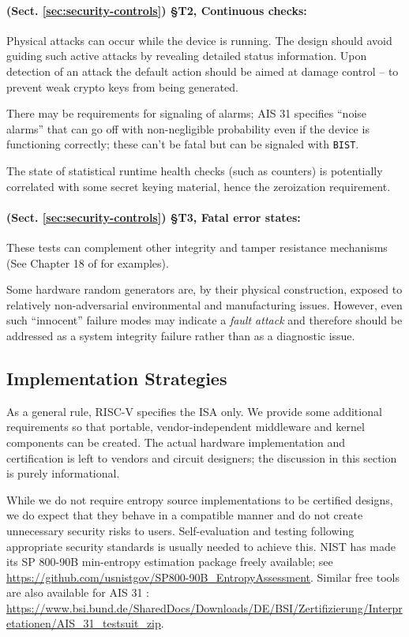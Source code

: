     \paragraph{(Sect. \ref{sec:security-controls}) \S T2, Continuous checks:}
    Physical attacks can occur while the device is running. The design
    should avoid guiding such active attacks by revealing detailed
    status information. Upon detection of an attack the default action
    should be aimed at damage control -- to prevent weak crypto keys from
    being generated.

    There may be requirements for signaling of alarms; AIS 31 specifies
    ``noise alarms'' that can go off with non-negligible probability
    even if the device is functioning correctly; these can't be fatal
    but can be signaled with \verb|BIST|.

    The state of statistical runtime health checks (such as counters)
    is potentially correlated with some secret keying material, hence
    the zeroization requirement.

    \paragraph{(Sect. \ref{sec:security-controls}) \S T3, Fatal error states:}
    These tests can complement other integrity and tamper resistance
    mechanisms (See Chapter 18 of \cite{An20} for examples).

    Some hardware random generators are, by their physical construction,
    exposed to relatively non-adversarial environmental and manufacturing
    issues. However, even such  ``innocent'' failure modes may indicate
    a  \emph{fault attack} \cite{KaScVe13} and therefore should be addressed
    as a system integrity failure rather than as a diagnostic issue.

\subsection{Implementation Strategies}

    As a general rule, RISC-V specifies the ISA only. We provide some
    additional requirements so that portable, vendor-independent middleware
    and kernel components can be created. The actual hardware
    implementation and certification is left to vendors and circuit designers;
    the discussion in this section is purely informational.

    While we do not require entropy source implementations to be
    certified designs, we do expect that they behave in a compatible manner
    and do not create unnecessary security risks to users. Self-evaluation
    and testing following appropriate security standards is usually needed
    to achieve this. NIST has made its SP 800-90B\cite{TuBaKe+18} min-entropy
    estimation package freely available; see
    \url{https://github.com/usnistgov/SP800-90B_EntropyAssessment}.
    Similar free tools are also available for AIS 31 \cite{KiSc11}:
    \url{https://www.bsi.bund.de/SharedDocs/Downloads/DE/BSI/Zertifizierung/Interpretationen/AIS_31_testsuit_zip}.



